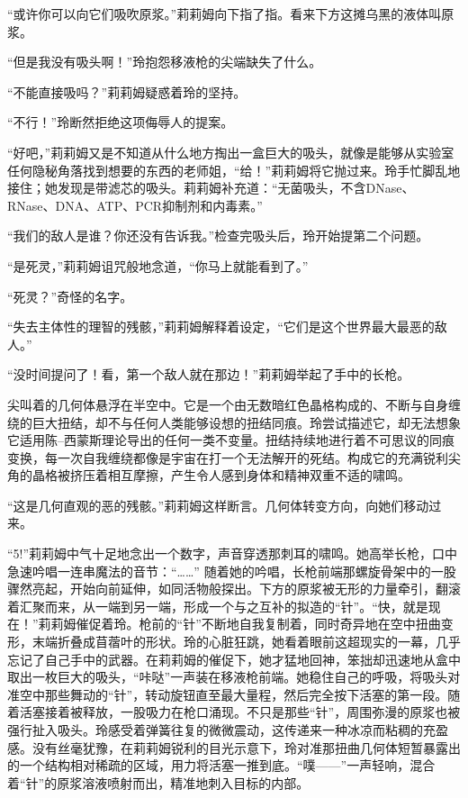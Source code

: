 “或许你可以向它们吸吹原浆。”莉莉姆向下指了指。看来下方这摊乌黑的液体叫原浆。

“但是我没有吸头啊！”玲抱怨移液枪的尖端缺失了什么。

“不能直接吸吗？”莉莉姆疑惑着玲的坚持。

“不行！”玲断然拒绝这项侮辱人的提案。

“好吧，”莉莉姆又是不知道从什么地方掏出一盒巨大的吸头，就像是能够从实验室任何隐秘角落找到想要的东西的老师姐，“给！”莉莉姆将它抛过来。玲手忙脚乱地接住；她发现是带滤芯的吸头。莉莉姆补充道：“无菌吸头，不含DNase、RNase、DNA、ATP、PCR抑制剂和内毒素。”

“我们的敌人是谁？你还没有告诉我。”检查完吸头后，玲开始提第二个问题。

“是死灵，”莉莉姆诅咒般地念道，“你马上就能看到了。”

“死灵？”奇怪的名字。

“失去主体性的理智的残骸，”莉莉姆解释着设定，“它们是这个世界最大最恶的敌人。”

“没时间提问了！看，第一个敌人就在那边！”莉莉姆举起了手中的长枪。

尖叫着的几何体悬浮在半空中。它是一个由无数暗红色晶格构成的、不断与自身缠绕的巨大扭结，却不与任何人类能够设想的扭结同痕。玲尝试描述它，却无法想象它适用陈–西蒙斯理论导出的任何一类不变量。扭结持续地进行着不可思议的同痕变换，每一次自我缠绕都像是宇宙在打一个无法解开的死结。构成它的充满锐利尖角的晶格被挤压着相互摩擦，产生令人感到身体和精神双重不适的啸鸣。

“这是几何直观的恶的残骸。”莉莉姆这样断言。几何体转变方向，向她们移动过来。

“5!”莉莉姆中气十足地念出一个数字，声音穿透那刺耳的啸鸣。她高举长枪，口中急速吟唱一连串魔法的音节：“……” 随着她的吟唱，长枪前端那螺旋骨架中的一股骤然亮起，开始向前延伸，如同活物般探出。下方的原浆被无形的力量牵引，翻滚着汇聚而来，从一端到另一端，形成一个与之互补的拟造的“针”。“快，就是现在！”莉莉姆催促着玲。枪前的“针”不断地自我复制着，同时奇异地在空中扭曲变形，末端折叠成苜蓿叶的形状。玲的心脏狂跳，她看着眼前这超现实的一幕，几乎忘记了自己手中的武器。在莉莉姆的催促下，她才猛地回神，笨拙却迅速地从盒中取出一枚巨大的吸头，“咔哒”一声装在移液枪前端。她稳住自己的呼吸，将吸头对准空中那些舞动的“针”，转动旋钮直至最大量程，然后完全按下活塞的第一段。随着活塞接着被释放，一股吸力在枪口涌现。不只是那些“针”，周围弥漫的原浆也被强行扯入吸头。玲感受着弹簧往复的微微震动，这传递来一种冰凉而粘稠的充盈感。没有丝毫犹豫，在莉莉姆锐利的目光示意下，玲对准那扭曲几何体短暂暴露出的一个结构相对稀疏的区域，用力将活塞一推到底。“噗——”一声轻响，混合着“针”的原浆溶液喷射而出，精准地刺入目标的内部。

